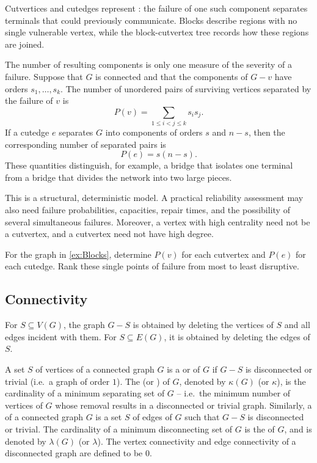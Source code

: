 Cutvertices and cutedges represent : the failure of one such component separates terminals that could previously communicate. Blocks describe regions with no single vulnerable vertex, while the block-cutvertex tree records how these regions are joined.

The number of resulting components is only one measure of the severity of a failure. Suppose that $G$ is connected and that the components of $G-v$ have orders $s_1,\ldots,s_k$. The number of unordered pairs of surviving vertices separated by the failure of $v$ is
\begin{equation*}
    P(v)=\sum_{1\le i<j\le k}s_i s_j.
\end{equation*}
If a cutedge $e$ separates $G$ into components of orders $s$ and $n-s$, then the corresponding number of separated pairs is
\begin{equation*}
    P(e)=s(n-s).
\end{equation*}
These quantities distinguish, for example, a bridge that isolates one terminal from a bridge that divides the network into two large pieces.

\begin{Remark*}
This is a structural, deterministic model. A practical reliability assessment may also need failure probabilities, capacities, repair times, and the possibility of several simultaneous failures. Moreover, a vertex with high centrality need not be a cutvertex, and a cutvertex need not have high degree.
\end{Remark*}

\begin{Exercise}
For the graph in \cref{ex:Blocks}, determine $P(v)$ for each cutvertex and $P(e)$ for each cutedge. Rank these single points of failure from most to least disruptive.
\end{Exercise}

\subsection{Connectivity}\label{subsec:Connectivity}

For $S\subseteq V(G)$, the graph $G-S$ is obtained by deleting the vertices of $S$ and all edges incident with them. For $S\subseteq E(G)$, it is obtained by deleting the edges of $S$.

A set $S$ of vertices of a connected graph $G$ is a  or  of $G$ if $G - S$ is disconnected or trivial (i.e.\ a graph of order $1$). The  (or ) of $G$, denoted by $\kappa(G)$ (or $\kappa$), is the cardinality of a minimum separating set of $G$ -- i.e.\ the minimum number of vertices of $G$ whose removal results in a disconnected or trivial graph. Similarly, a  of a connected graph $G$ is a set $S$ of edges of $G$ such that $G - S$ is disconnected or trivial. The cardinality of a minimum disconnecting set of $G$ is the  of $G$, and is denoted by $\lambda(G)$ (or $\lambda$). The vertex connectivity and edge connectivity of a disconnected graph are defined to be $0$.

